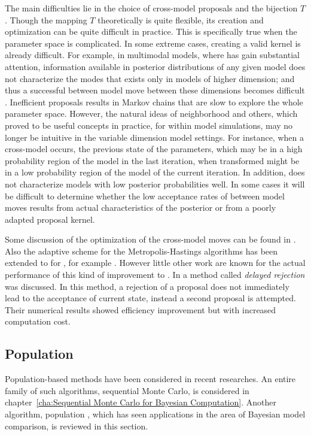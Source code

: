The main difficulties lie in the choice of cross-model proposals and the
bijection $T$. Though the mapping $T$ theoretically is quite flexible, its
creation and optimization can be quite difficult in practice. This is
specifically true when the parameter space is complicated. In some extreme
cases, creating a valid kernel is already difficult. For example, in
multimodal models, where \rjmcmc has gain substantial attention, information
available in posterior distributions of any given model does not characterize
the modes that exists only in models of higher dimension; and thus a
successful between model move between these dimensions becomes difficult
\cite{Jasra:2007id}. Inefficient proposals results in Markov chains that are
slow to explore the whole parameter space. However, the natural ideas of
neighborhood and others, which proved to be useful concepts in practice, for
within model simulations, may no longer be intuitive in the variable dimension
model settings. For instance, when a cross-model occurs, the previous state of
the parameters, which may be in a high probability region of the model in the
last iteration, when transformed might be in a low probability region of the
model of the current iteration. In addition, \rjmcmc does not characterize
models with low posterior probabilities well. In some cases it will be
difficult to determine whether the low acceptance rates of between model moves
results from actual characteristics of the posterior or from a poorly adapted
proposal kernel.

Some discussion of the optimization of the cross-model moves can be found in
\cite{Green:2009tr}. Also the adaptive scheme for the Metropolis-Hastings
algorithms has been extended to for \rjmcmc, for example \cite{Hastie:2005vi}.
However little other work are known for the actual performance of this kind of
improvement to \rjmcmc. In \cite{Green:2001tk} a method called \emph{delayed
  rejection} was discussed. In this method, a rejection of a proposal does not
immediately lead to the acceptance of current state, instead a second proposal
is attempted. Their numerical results showed efficiency improvement but with
increased computation cost.

\subsection{Population \protect\mcmc}
\label{sub:Population mcmc}

Population-based methods have been considered in recent researches. An entire
family of such algorithms, sequential Monte Carlo, is considered in
chapter~\ref{cha:Sequential Monte Carlo for Bayesian Computation}. Another
algorithm, population \mcmc, which has seen applications in the area of
Bayesian model comparison, is reviewed in this section.

